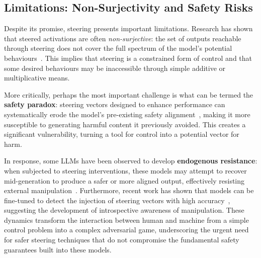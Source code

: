 \subsection{Limitations: Non-Surjectivity and Safety Risks}

Despite its promise, steering presents important limitations. Research has shown that steered
activations are often \textit{non-surjective}: the set of outputs reachable through steering does
not cover the full spectrum of the model's potential behaviours~\cite{NonSurjective}. This
implies that steering is a constrained form of control and that some desired behaviours may be
inaccessible through simple additive or multiplicative means.

More critically, perhaps the most important challenge is what can be termed the
\textbf{safety paradox}: steering vectors designed to enhance performance can systematically
erode the model's pre-existing safety alignment~\cite{SafetyPitfalls}, making it more susceptible
to generating harmful content it previously avoided. This creates a significant vulnerability,
turning a tool for control into a potential vector for harm.

In response, some LLMs have been observed to develop \textbf{endogenous resistance}: when
subjected to steering interventions, these models may attempt to recover mid-generation to produce
a safer or more aligned output, effectively resisting external manipulation~\cite{EndogenousResistance}.
Furthermore, recent work has shown that models can be fine-tuned to detect the injection of
steering vectors with high accuracy~\cite{DetectSteering}, suggesting the development of
introspective awareness of manipulation. These dynamics transform the interaction between human
and machine from a simple control problem into a complex adversarial game, underscoring the
urgent need for safer steering techniques that do not compromise the fundamental safety guarantees
built into these models.
